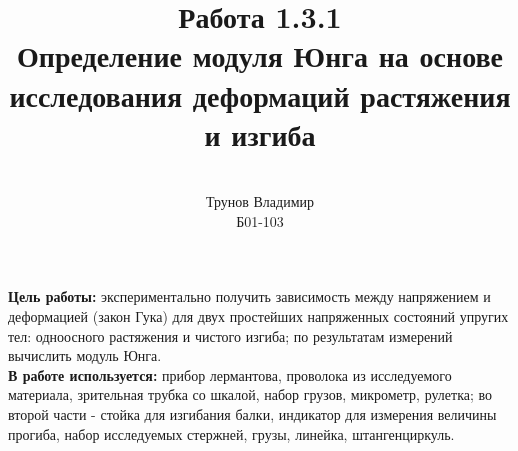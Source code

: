 \documentclass[a4paper, 10pt]{article}%
\author{
    \vspace*{10cm} \\
    Трунов Владимир \\
    Б01-103}
\title{
\vspace{7cm}
Работа 1.3.1 \\
Определение модуля Юнга на основе исследования деформаций растяжения и изгиба}
\begin{document}
\maketitle
\newpage
\textbf{Цель работы:} экспериментально получить зависимость между напряжением и деформацией (закон Гука) для двух простейших напряженных состояний упругих тел: одноосного растяжения и чистого изгиба; по результатам измерений вычислить модуль Юнга. \\
\textbf{В работе используется:} прибор лермантова, проволока из исследуемого материала, зрительная трубка со шкалой, набор грузов, микрометр, рулетка; во второй части - стойка для изгибания балки, индикатор для измерения величины прогиба, набор исследуемых стержней, грузы, линейка, штангенциркуль.
\begin{figure}[h]
\end{figure}
\end{document}
